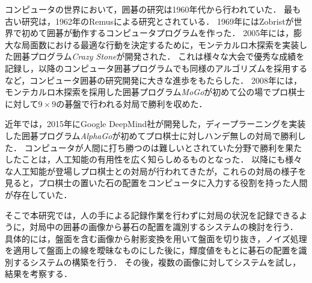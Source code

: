 \documentclass[openright]{nitocs}
\numberwithin{equation}{section}
\begin{document}
        コンピュータの世界において，囲碁の研究は1960年代から行われていた．
        最も古い研究は，1962年のRemusによる研究\cite{Remus}とされている．
        1969年にはZobristが世界で初めて囲碁が動作するコンピュータプログラムを作った\cite{Zobrist}．
        2005年には，膨大な局面数における最適な行動を決定するために，モンテカルロ木探索を実装した囲碁プログラム{\it Crazy Stone}\cite{CrazyStone}が開発された．
        これは様々な大会で優秀な成績を記録し，以降のコンピュータ囲碁プログラムでも同様のアルゴリズムを採用するなど，コンピュータ囲碁の研究開発に大きな進歩をもたらした．
        2008年には，モンテカルロ木探索を採用した囲碁プログラム{\it MoGo}が初めて公の場でプロ棋士に対して$9\times9$の碁盤で行われる対局で勝利を収めた\cite{mogo}．

        近年では，2015年にGoogle DeepMind社が開発した，ディープラーニングを実装した囲碁プログラム{\it AlphaGo}\cite{AlphaGo}が初めてプロ棋士に対しハンデ無しの対局で勝利した．
        コンピュータが人間に打ち勝つのは難しいとされていた分野で勝利を果たしたことは，人工知能の有用性を広く知らしめるものとなった．
        以降にも様々な人工知能が登場しプロ棋士との対局が行われてきたが，これらの対局の様子を見ると，プロ棋士の置いた石の配置をコンピュータに入力する役割を持った人間が存在していた．

        そこで本研究では，人の手による記録作業を行わずに対局の状況を記録できるように，対局中の囲碁の画像から碁石の配置を識別するシステムの検討を行う．
        具体的には，盤面を含む画像から射影変換を用いて盤面を切り抜き，ノイズ処理を適用して盤面上の線を曖昧なものにした後に，輝度値をもとに碁石の配置を識別するシステムの構築を行う．
        その後，複数の画像に対してシステムを試し，結果を考察する．
\end{document}
